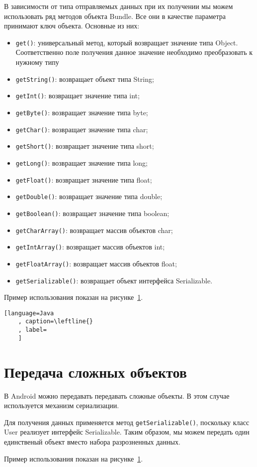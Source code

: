В зависимости от типа отправляемых данных при их получении мы можем
использовать ряд методов объекта Bundle. Все они в качестве параметра
принимают ключ объекта. Основные из них:
\begin{itemize}
	\item \texttt{get()}: универсальный метод, который возвращает значение типа
		Object. Соответственно поле получения данное значение необходимо
		преобразовать к нужному типу
	\item \texttt{getString()}: возвращает объект типа String;
	\item \texttt{getInt()}: возвращает значение типа int;
	\item \texttt{getByte()}: возвращает значение типа byte;
	\item \texttt{getChar()}: возвращает значение типа char;
	\item \texttt{getShort()}: возвращает значение типа short;
	\item \texttt{getLong()}: возвращает значение типа long;
	\item \texttt{getFloat()}: возвращает значение типа float;
	\item \texttt{getDouble()}: возвращает значение типа double;
	\item \texttt{getBoolean()}: возвращает значение типа boolean;
	\item \texttt{getCharArray()}: возвращает массив объектов char;
	\item \texttt{getIntArray()}: возвращает массив объектов int;
	\item \texttt{getFloatArray()}: возвращает массив объектов float;
	\item \texttt{getSerializable()}: возвращает объект
		интерфейса Serializable.
\end{itemize}

Пример использования показан на рисунке~\ref{}.

\begin{lstlisting}[language=Java
	, caption=\leftline{}
	, label=
	]
\end{lstlisting}

\section{Передача сложных объектов}
В Android можно передавать передавать сложные объекты.
В этом случае используется механизм сериализации.\par
Для получения данных применяется метод \texttt{getSerializable()},
поскольку класс User реализует интерфейс Serializable.
Таким образом, мы можем передать один единственый объект вместо набора
разрозненных данных.\par
Пример использования показан на рисунке~\ref{}.

